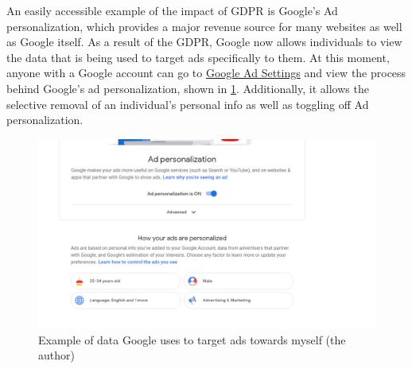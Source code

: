 \documentclass[
	letterpaper, %
]{jdf}
\begin{document}
An easily accessible example of the impact of GDPR is Google's Ad personalization, which provides a major revenue source for many websites as well as Google itself. As a result of the GDPR, Google now allows individuals to view the data that is being used to target ads specifically to them. At this moment, anyone with a Google account can go to \href{https://adssettings.google.com/}{Google Ad Settings} and view the process behind Google's ad personalization, shown in \ref{fig:google-ads}. Additionally, it allows the selective removal of an individual's personal info as well as toggling off Ad personalization.

\begin{figure}
	\centering
	\includegraphics[width=0.7\linewidth]{../figures/google-ads}
	\caption{Example of data Google uses to target ads towards myself (the author)}
	\label{fig:google-ads}
\end{figure}
\end{document}
